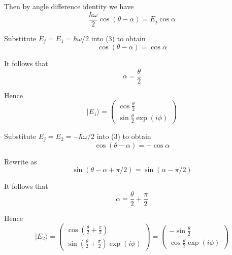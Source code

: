 \documentclass[12pt]{article}
\begin{document}
Then by angle difference identity we have
\begin{equation*}
\frac{\hbar\omega}{2}\cos(\theta-\alpha)=E_j\cos\alpha
\tag{3}
\end{equation*}

Substitute $E_j=E_1=\hbar\omega/2$ into (3) to obtain
\begin{equation*}
\cos(\theta-\alpha)=\cos\alpha
\end{equation*}

It follows that
\begin{equation*}
\alpha=\frac{\theta}{2}
\end{equation*}

Hence
\begin{equation*}
|E_1\rangle=\begin{pmatrix}\cos\frac{\theta}{2}\\[1ex]\sin\frac{\theta}{2}\exp(i\phi)\end{pmatrix}
\end{equation*}

Substitute $E_j=E_2=-\hbar\omega/2$ into (3) to obtain
\begin{equation*}
\cos(\theta-\alpha)=-\cos\alpha
\end{equation*}

Rewrite as
\begin{equation*}
\sin(\theta-\alpha+\pi/2)=\sin(\alpha-\pi/2)
\end{equation*}

It follows that
\begin{equation*}
\alpha=\frac{\theta}{2}+\frac{\pi}{2}
\end{equation*}

Hence
\begin{equation*}
|E_2\rangle=\begin{pmatrix}\cos\left(\frac{\theta}{2}+\frac{\pi}{2}\right)
\\[1ex]
\sin\left(\frac{\theta}{2}+\frac{\pi}{2}\right)\exp(i\phi)
\end{pmatrix}
=\begin{pmatrix}
-\sin\frac{\theta}{2}
\\[1ex]
\cos\frac{\theta}{2}\exp(i\phi)
\end{pmatrix}
\end{equation*}
\end{document}
